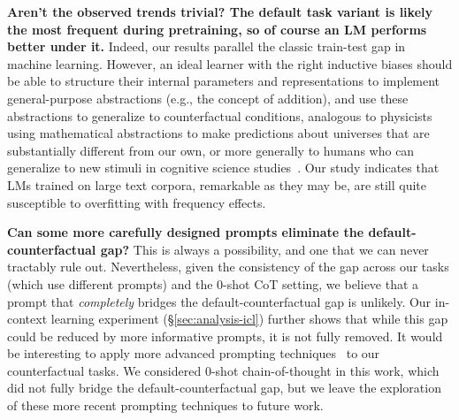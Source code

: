 \textbf{Aren't the observed trends trivial? The default task variant is likely the most frequent during pretraining, so of course an LM performs better under it.}
Indeed,  our results parallel the classic train-test gap in machine learning. However, an ideal learner with the right inductive biases should be able to structure their internal parameters and representations to implement general-purpose abstractions (e.g., the concept of addition), and use these abstractions to generalize to counterfactual conditions, analogous to physicists using mathematical abstractions to make predictions about universes that are substantially different from our own, or more generally to humans who can generalize to new stimuli in cognitive science studies~\citep{Lagnado2013CausalRA,Gerstenberg2017EyeTrackingC,Gerstenberg2021ACS}. Our study indicates that LMs trained on large text corpora,
remarkable as they may be, are still quite susceptible to overfitting with frequency effects.

\textbf{Can some more carefully designed prompts eliminate the default-counterfactual gap?}
This is always a possibility, and one that we can never tractably rule out. Nevertheless, given the consistency of the gap across our tasks (which use different prompts) and the 0-shot CoT setting, we believe that a prompt that \emph{completely} bridges the default-counterfactual gap is unlikely.   Our in-context learning experiment (\S\ref{sec:analysis-icl}) further shows that while this gap could be reduced by more informative prompts,  it is not fully removed. It would be interesting to apply more advanced prompting techniques~ to our counterfactual tasks. We considered 0-shot chain-of-thought in this work, which did not fully bridge the default-counterfactual gap, but we leave the exploration of these more recent prompting techniques to future work.




